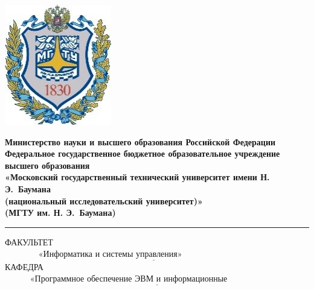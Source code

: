 \begin{titlepage}
	\fontsize{12pt}{12pt}\selectfont
	\noindent \begin{minipage}{0.15\textwidth}
		\includegraphics[width=\linewidth]{img/b_logo.jpg}
	\end{minipage}
	\noindent\begin{minipage}{0.9\textwidth}\centering
		\textbf{Министерство науки и высшего образования Российской Федерации}\\
		\textbf{Федеральное государственное бюджетное образовательное учреждение высшего образования}\\
		\textbf{«Московский государственный технический университет имени Н. Э.~Баумана}\\
		\textbf{(национальный исследовательский университет)»}\\
		\textbf{(МГТУ им. Н. Э.~Баумана)}
	\end{minipage}

	\noindent\rule{18cm}{3pt}
	\newline\newline
	\noindent ФАКУЛЬТЕТ $\underline{\text{~~~~~~~~~~~~«Информатика и системы управления»~~~~~~~~~~~~~~~~~~~~~~~~~~~~~~~~~~~~~~~~~~~}}$ \newline\newline
	\noindent КАФЕДРА $\underline{\text{~~~~~~~~~«Программное обеспечение ЭВМ и информационные технологии»~~~~~~~~~~~~~~}}$\newline\newline\newline\newline\newline\newline\newline



\end{titlepage}
